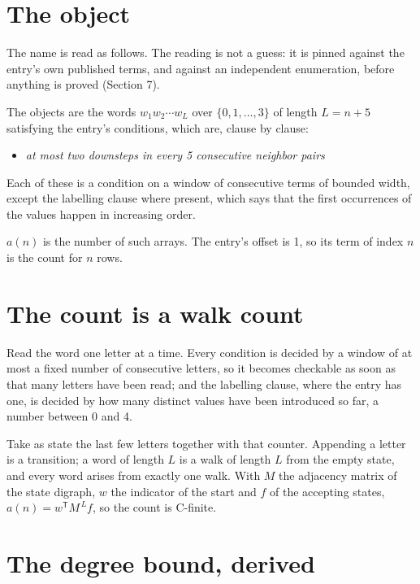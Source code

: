 \documentclass[11pt]{article}
\theoremstyle{definition}
\begin{document}
\section{The object}

The name is read as follows. The reading is not a guess: it is pinned against the entry's own published terms, and against an independent enumeration, before anything is proved (Section 7).

The objects are the words $w_1 w_2 \cdots w_L$ over $\{0,1,\dots,3\}$ of length $L = n + 5$ satisfying the entry's conditions, which are, clause by clause:

\begin{itemize}

\item {\itshape at most two downsteps in every 5 consecutive neighbor pairs}

\end{itemize}

Each of these is a condition on a window of consecutive terms of bounded width, except the labelling clause where present, which says that the first occurrences of the values happen in increasing order.

$a(n)$ is the number of such arrays. The entry's offset is 1, so its term of index $n$ is the count for $n$ rows.

\section{The count is a walk count}

Read the word one letter at a time. Every condition is decided by a window of at most a fixed number of consecutive letters, so it becomes checkable as soon as that many letters have been read; and the labelling clause, where the entry has one, is decided by how many distinct values have been introduced so far, a number between $0$ and 4.

Take as state the last few letters together with that counter. Appending a letter is a transition; a word of length $L$ is a walk of length $L$ from the empty state, and every word arises from exactly one walk. With $M$ the adjacency matrix of the state digraph, $w$ the indicator of the start and $f$ of the accepting states, $a(n) = w^{\mathsf T}M^{\,L}f$, so the count is C-finite.

\section{The degree bound, derived}
\end{document}

